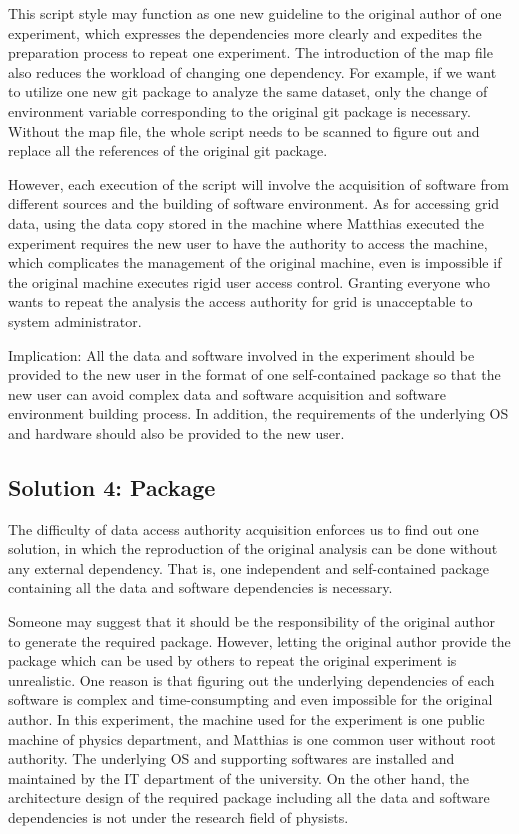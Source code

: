 \documentclass{acm_proc_article-sp}
\begin{document}
This script style may function as one new guideline to the original author of one experiment, which expresses the dependencies more clearly and expedites the preparation process to 
repeat one experiment. The introduction of the map file also reduces the workload of changing one dependency. For example, if we want to utilize one new git package to analyze the same dataset, only the change of environment variable corresponding to the original git package is necessary. Without the map file, the whole script needs to be scanned to figure out and replace all the references of the original git package.

However, each execution of the script
will involve the acquisition of software from different sources and the
building of software environment. As for accessing grid data, using the data
copy stored in the machine where Matthias executed the experiment requires the
new user to have the authority to access the machine, which complicates the
management of the original machine, even is impossible if the original machine
executes rigid user access control. Granting everyone who wants to repeat the
analysis the access authority for grid is unacceptable to system administrator. 

Implication: All the data and software involved in the experiment should be
provided to the new user in the format of one self-contained package so that
the new user can avoid complex data and software acquisition and software
environment building process. In addition, the requirements of the underlying
OS and hardware should also be provided to the new user.

\subsection{Solution 4: Package}
The difficulty of data access authority acquisition enforces us to find out one
solution, in which the reproduction of the original analysis can be done
without any external dependency. That is, one independent and self-contained
package containing all the data and software dependencies is necessary. 

Someone may suggest that it should be the responsibility of the original author
to generate the required package. However, letting the original author provide
the package which can be used by others to repeat the original experiment is
unrealistic. One reason is that figuring out the underlying dependencies of
each software is complex and time-consumpting and even impossible for the
original author. In this experiment, the machine used for the experiment is one
public machine of physics department, and Matthias is one common user without
root authority. The underlying OS and supporting softwares are installed and
maintained by the IT department of the university. On the other hand, the
architecture design of the required package including all the data and software
dependencies is not under the research field of physists.
\end{document}
